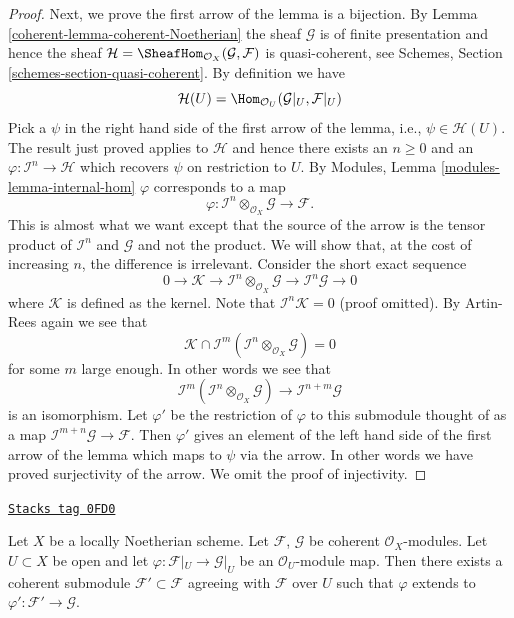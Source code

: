 \begin{proof}
\medskip\noindent
Next, we prove the first arrow of the lemma is a bijection.
By Lemma \ref{coherent-lemma-coherent-Noetherian} the sheaf $\mathcal{G}$
is of finite presentation and hence the sheaf
$\mathcal{H} = \SheafHom_{\mathcal{O}_X}(\mathcal{G}, \mathcal{F})$
is quasi-coherent, see
Schemes, Section \ref{schemes-section-quasi-coherent}.
By definition we have
$$
\mathcal{H}(U)
=
\Hom_{\mathcal{O}_U}(\mathcal{G}|_U, \mathcal{F}|_U)
$$
Pick a $\psi$ in the right hand side of the first arrow of the
lemma, i.e.,  $\psi \in \mathcal{H}(U)$. The result just proved applies
to $\mathcal{H}$ and hence there exists an $n \geq 0$ and an
$\varphi : \mathcal{I}^n \to \mathcal{H}$ which recovers
$\psi$ on restriction to $U$. By
Modules, Lemma \ref{modules-lemma-internal-hom}
$\varphi$ corresponds to a map
$$
\varphi :
\mathcal{I}^n \otimes_{\mathcal{O}_X} \mathcal{G}
\longrightarrow
\mathcal{F}.
$$
This is almost what we want except that the source of the arrow
is the tensor product of $\mathcal{I}^n$ and $\mathcal{G}$
and not the product. We will show that, at the cost of increasing $n$,
the difference is irrelevant. Consider the short exact sequence
$$
0 \to \mathcal{K} \to
\mathcal{I}^n \otimes_{\mathcal{O}_X} \mathcal{G} \to
\mathcal{I}^n\mathcal{G} \to 0
$$
where $\mathcal{K}$ is defined as the kernel. Note that
$\mathcal{I}^n\mathcal{K} = 0$ (proof omitted). By Artin-Rees
again we see that
$$
\mathcal{K}
\cap
\mathcal{I}^m(\mathcal{I}^n \otimes_{\mathcal{O}_X} \mathcal{G})
=
0
$$
for some $m$ large enough. In other words we see that
$$
\mathcal{I}^m(\mathcal{I}^n \otimes_{\mathcal{O}_X} \mathcal{G})
\longrightarrow
\mathcal{I}^{n + m}\mathcal{G}
$$
is an isomorphism. Let $\varphi'$ be the restriction of
$\varphi$ to this submodule thought of as a map
$\mathcal{I}^{m + n}\mathcal{G} \to \mathcal{F}$.
Then $\varphi'$ gives an element
of the left hand side of the first arrow of the lemma which
maps to $\psi$ via the arrow. In other words we have proved surjectivity
of the arrow. We omit the proof of injectivity.
\end{proof}

\begin{lemma}
\label{coherent-lemma-extend-coherent}
\href{https://stacks.math.columbia.edu/tag/0FD0}{\texttt{Stacks tag 0FD0}}

Let $X$ be a locally Noetherian scheme. Let $\mathcal{F}$, $\mathcal{G}$
be coherent $\mathcal{O}_X$-modules. Let $U \subset X$ be open and
let $\varphi : \mathcal{F}|_U \to \mathcal{G}|_U$ be an
$\mathcal{O}_U$-module map. Then there exists a coherent
submodule $\mathcal{F}' \subset \mathcal{F}$ agreeing with
$\mathcal{F}$ over $U$ such that $\varphi$ extends to
$\varphi' : \mathcal{F}' \to \mathcal{G}$.
\end{lemma}

